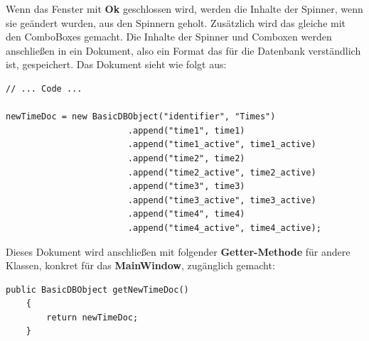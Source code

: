 Wenn das Fenster mit \textbf{Ok} geschlossen wird, werden die Inhalte der Spinner, wenn sie geändert wurden, aus den Spinnern geholt. Zusätzlich wird das gleiche mit den ComboBoxes gemacht. Die Inhalte der Spinner und Comboxen werden anschließen in ein Dokument, also ein Format das für die Datenbank verständlich ist, gespeichert. Das Dokument sieht wie folgt aus:
\begin{lstlisting}[style=Javastyle, caption=Zeitendokument]
// ... Code ...

newTimeDoc = new BasicDBObject("identifier", "Times")
                        .append("time1", time1)
                        .append("time1_active", time1_active)
                        .append("time2", time2)
                        .append("time2_active", time2_active)
                        .append("time3", time3)
                        .append("time3_active", time3_active)
                        .append("time4", time4)
                        .append("time4_active", time4_active);
\end{lstlisting}
Dieses Dokument wird anschließen mit folgender \textbf{Getter-Methode} für andere Klassen, konkret für das \textbf{MainWindow}, zugänglich gemacht:
\begin{lstlisting}[style=Javastyle, caption=Zeitendokument Getter-Methode]
public BasicDBObject getNewTimeDoc()
    {
        return newTimeDoc;
    }
\end{lstlisting}

\newpage


